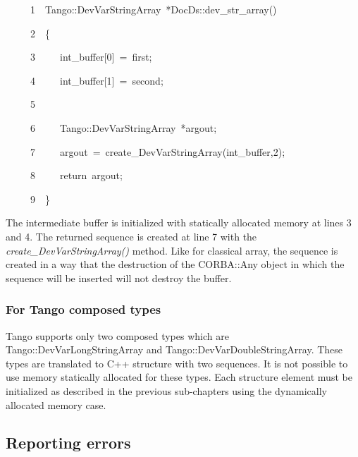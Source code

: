 
\begin{lyxcode}
~~~~~1~~Tango::DevVarStringArray~{*}DocDs::dev\_str\_array()

~~~~~2~~\{

~~~~~3~~~~~int\_buffer{[}0{]}~=~\textquotedbl{}first\textquotedbl{};

~~~~~4~~~~~int\_buffer{[}1{]}~=~\textquotedbl{}second\textquotedbl{};

~~~~~5~~

~~~~~6~~~~~Tango::DevVarStringArray~{*}argout;

~~~~~7~~~~~argout~=~create\_DevVarStringArray(int\_buffer,2);

~~~~~8~~~~~return~argout;

~~~~~9~~\}
\end{lyxcode}


The intermediate buffer is initialized with statically allocated memory
at lines 3 and 4. The returned sequence is created at line 7 with
the \emph{create\_DevVarStringArray()}
method. Like for classical array, the sequence is created in a way
that the destruction of the CORBA::Any object in which
the sequence will be inserted will not destroy the buffer.

\subsubsection{For Tango composed types}

Tango supports only two composed types which are Tango::DevVarLongStringArray
and Tango::DevVarDoubleStringArray.
These types are translated to C++ structure with two sequences. It
is not possible to use memory statically allocated for these types.
Each structure element must be initialized as described in the previous
sub-chapters using the dynamically allocated memory case.

\subsection{Reporting errors\label{subsec:Reporting-errors}}

